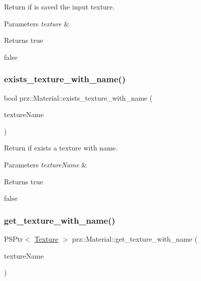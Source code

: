 Return if is saved the input texture. 


\begin{DoxyParams}{Parameters}
{\em texture} & \\
\hline
\end{DoxyParams}
\begin{DoxyReturn}{Returns}
true 

false 
\end{DoxyReturn}
\mbox{\label{classprz_1_1_material_a37642f991c010bec61b60cffb5ae44cb}} 
\subsubsection{\texorpdfstring{exists\_texture\_with\_name()}{exists\_texture\_with\_name()}}
{\footnotesize\ttfamily bool prz\+::\+Material\+::exists\+\_\+texture\+\_\+with\+\_\+name (\begin{DoxyParamCaption}\item[{const P\+String \&}]{texture\+Name }\end{DoxyParamCaption})}



Return if exists a texture with name. 


\begin{DoxyParams}{Parameters}
{\em texture\+Name} & \\
\hline
\end{DoxyParams}
\begin{DoxyReturn}{Returns}
true 

false 
\end{DoxyReturn}
\mbox{\label{classprz_1_1_material_a2e6d6a6b47a8f79bc07191fdd2a5ed98}} 
\subsubsection{\texorpdfstring{get\_texture\_with\_name()}{get\_texture\_with\_name()}}
{\footnotesize\ttfamily P\+S\+Ptr$<$ \mbox{\hyperlink{classprz_1_1_texture}{Texture}} $>$ prz\+::\+Material\+::get\+\_\+texture\+\_\+with\+\_\+name (\begin{DoxyParamCaption}\item[{const P\+String \&}]{texture\+Name }\end{DoxyParamCaption})}



